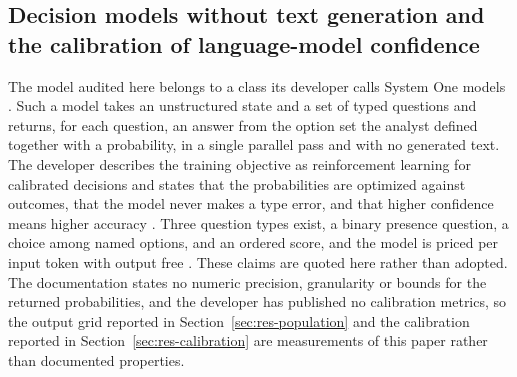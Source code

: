 \subsection{Decision models without text generation and the calibration of language-model confidence}
\label{sec:bg-decision}

The model audited here belongs to a class its developer calls System One models
\citep{typesafe2026systemone}. Such a model takes an unstructured state and a set of typed
questions and returns, for each question, an answer from the option set the analyst defined
together with a probability, in a single parallel pass and with no generated text. The developer describes the
training objective as reinforcement learning for calibrated decisions and states that the
probabilities are optimized against outcomes, that the model never makes a type error, and
that higher confidence means higher accuracy \citep{typesafe2026launch}. Three question types
exist, a binary presence question, a choice among named options, and an ordered score, and
the model is priced per input token with output free \citep{typesafe2026models}. These
claims are quoted here rather than adopted. The documentation states no numeric precision,
granularity or bounds for the returned probabilities, and the developer has published no
calibration metrics, so the output grid reported in Section~\ref{sec:res-population} and the
calibration reported in Section~\ref{sec:res-calibration} are measurements of this paper
rather than documented properties.


